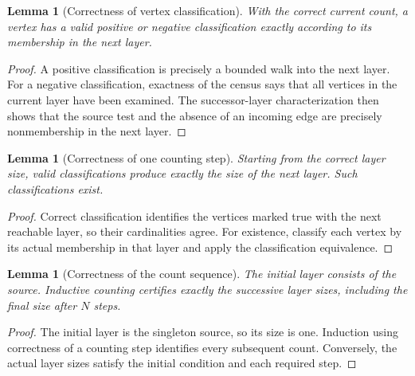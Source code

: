 \documentclass[11pt]{article}
\newtheorem{lemma}[theorem]{Lemma}
\theoremstyle{definition}
\begin{document}
\begin{lemma}[Correctness of vertex classification]\leavevmode
With the correct current count, a vertex has a valid positive or negative
classification exactly according to its membership in the next layer.

\end{lemma}
\begin{proof}\leavevmode
A positive classification is precisely a bounded walk into the next layer. For a negative classification, exactness of the census says that all vertices in the current layer have been examined. The successor-layer characterization then shows that the source test and the absence of an incoming edge are precisely nonmembership in the next layer.\qedhere
\end{proof}

\begin{lemma}[Correctness of one counting step]\leavevmode
Starting from the correct layer size, valid classifications produce exactly
the size of the next layer. Such classifications exist.

\end{lemma}
\begin{proof}\leavevmode
Correct classification identifies the vertices marked true with the next reachable layer, so their cardinalities agree. For existence, classify each vertex by its actual membership in that layer and apply the classification equivalence.\qedhere
\end{proof}

\begin{lemma}[Correctness of the count sequence]\leavevmode
The initial layer consists of the source. Inductive counting certifies
exactly the successive layer sizes, including the final size after $N$ steps.

\end{lemma}
\begin{proof}\leavevmode
The initial layer is the singleton source, so its size is one. Induction using correctness of a counting step identifies every subsequent count. Conversely, the actual layer sizes satisfy the initial condition and each required step.\qedhere
\end{proof}
\end{document}

